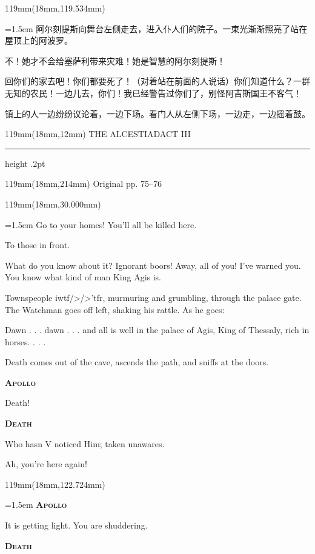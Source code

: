 \documentclass{article}
\newcommand{\ENsetup}{\normalfont\color{ink}\fontsize{11}{16.5}\selectfont\emergencystretch=1.5em}
\newcommand{\ZHsetup}{\normalfont\color{ink}\fontsize{10.5}{17}\selectfont\emergencystretch=1.5em}
\newcommand{\ENspeaker}[1]{{\fontsize{9.8}{13}\selectfont\scshape\bfseries #1}\par\vspace{3pt}}
\newcommand{\ZHspeaker}[1]{{\hei\fontsize{10.3}{13}\selectfont #1}\par\vspace{3pt}}
\newcommand{\Block}[3]{\begin{textblock*}{119mm}(18mm,#1mm){#2 #3\par}\end{textblock*}}
\newcommand{\Heading}[3]{%
  \begin{textblock*}{119mm}(18mm,12mm)
    \color{quiet}\fontsize{7.5}{10}\selectfont
    #1\hfill #2\par\vspace{3mm}\hrule height .2pt
  \end{textblock*}
  \begin{textblock*}{119mm}(18mm,214mm)
    \color{quiet}\fontsize{7}{10}\selectfont #3\hfill\thepage
  \end{textblock*}
}
\begin{document}
\Block{119.534}{\ZHsetup}{\kai 阿尔刻提斯向舞台左侧走去，进入仆人们的院子。一束光渐渐照亮了站在屋顶上的阿波罗。\par \vspace{2.2mm}\ZHspeaker{居民}不！她才不会给塞萨利带来灾难！她是智慧的阿尔刻提斯！\par \vspace{2.2mm}\ZHspeaker{看门人}{\kai （在反对的声音浪潮中高喊着）}回你们的家去吧！你们都要死了！{\kai （对着站在前面的人说话）}你们知道什么？一群无知的农民！一边儿去，你们！我已经警告过你们了，别怪阿吉斯国王不客气！\par \vspace{2.2mm}\kai 镇上的人一边纷纷议论着，一边下场。看门人从左侧下场，一边走，一边摇着鼓。\par }
\newpage
\null
\Heading{THE ALCESTIAD}{ACT III}{Original pp. 75–76}
\Block{30.000}{\ENsetup}{\sloppy
Go to your homes! You'll all be killed here.\par\vspace{2pt}
To those in front.\par\vspace{2pt}
What do you know about it? Ignorant boors! Away, all of you! I've warned you. You know what kind of man King Agis is.\par\vspace{2pt}
Townspeople iwtf/>/>'tfr, murmuring and grumbling, through the palace gate. The Watchman goes off left, shaking his rattle. As he goes:\par\vspace{2pt}
Dawn . . . dawn . . . and all is well in the palace of Agis, King of Thessaly, rich in horses. . . .\par\vspace{2pt}
Death comes out of the cave, ascends the path, and sniffs at the doors.\par\vspace{2pt}
\ENspeaker{Apollo}
Death!\par\vspace{2pt}
\ENspeaker{Death}
Who hasn V noticed Him; taken unawares.\par\vspace{2pt}
Ah, you're here again!\par\vspace{2pt}}
\Block{122.724}{\ENsetup}{\sloppy
\ENspeaker{Apollo}
It is getting light. You are shuddering.\par\vspace{2pt}
\ENspeaker{Death}}
\end{document}

